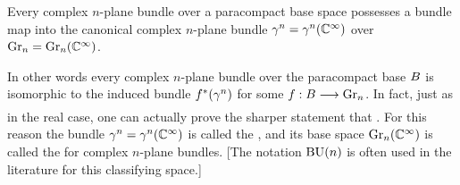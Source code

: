 \documentclass[../main]{subfiles}
\begin{document}
\begin{theorem}
\label{thm:14.6}
Every complex $n$-plane bundle over a paracompact base space possesses a bundle map into the canonical complex $n$-plane bundle $\gamma^n = \gamma^n(\mathbb C^\infty)$ over $\operatorname{Gr}_{n} = \operatorname{Gr}_{n}(\mathbb C^\infty)$.
\end{theorem}
In other words every complex $n$-plane bundle over the paracompact base $B$ is isomorphic to the induced bundle $f^\ast(\gamma^{n})$ for some $f: \B \varrightarrow{} \grassmannian_n$. In fact, just as in the real case, one can actually prove the sharper statement that . For this reason the bundle $\gamma^{n}=\gamma^{n}(\mathbb C^{\infty})$ is called the , and its base space $\operatorname{Gr}_{n}(\mathbb C^{\infty})$ is called the  for complex $n$-plane bundles. [The notation $\operatorname{BU}(n)$ is often used in the literature for this classifying space.]
\end{document}
